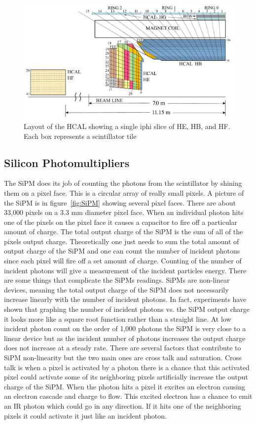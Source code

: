 \begin{figure}
\centering
\includegraphics[width=\linewidth]{Figures/Depthsegmentation.pdf}
\caption{Layout of the HCAL showing a single iphi slice of HE, HB, and HF. Each box represents a scintillator tile}
\label{fig:Depth}
\end{figure}

\subsection{Silicon Photomultipliers}
The SiPM does its job of counting the photons from the scintillator by shining them on a pixel face. This is a circular array of really small pixels. A picture of the SiPM is in figure~\ref{fig:SiPM} showing several pixel faces. There are about 33,000 pixels on a 3.3 mm diameter pixel face. When an individual photon hits one of the pixels on the pixel face it causes a capacitor to fire off a particular amount of charge. The total output charge of the SiPM is the sum of all of the pixels output charge. Theoretically one just needs to sum the total amount of output charge of the SiPM and one can count the number of incident photons since each pixel will fire off a set amount of charge. Counting of the number of incident photons will give a measurement of the incident particles energy. There are some things that complicate the SiPMs readings. SiPMs are non-linear devices, meaning the total output charge of the SiPM does not necessarily increase linearly with the number of incident photons. In fact, experiments have shown that graphing the number of incident photons vs. the SiPM output charge it looks more like a square root function rather than a straight line. At low incident photon count on the order of 1,000 photons the SiPM is very close to a linear device but as the incident number of photons increases the output charge does not increase at a steady rate. There are several factors that contribute to SiPM non-linearity but the two main ones are cross talk and saturation. Cross talk is when a pixel is activated by a photon there is a chance that this activated pixel could activate some of its neighboring pixels artificially increase the output charge of the SiPM. When the photon hits a pixel it excites an electron causing an electron cascade and charge to flow. This excited electron has a chance to emit an IR photon which could go in any direction. If it hits one of the neighboring pixels it could activate it just like an incident photon. 

